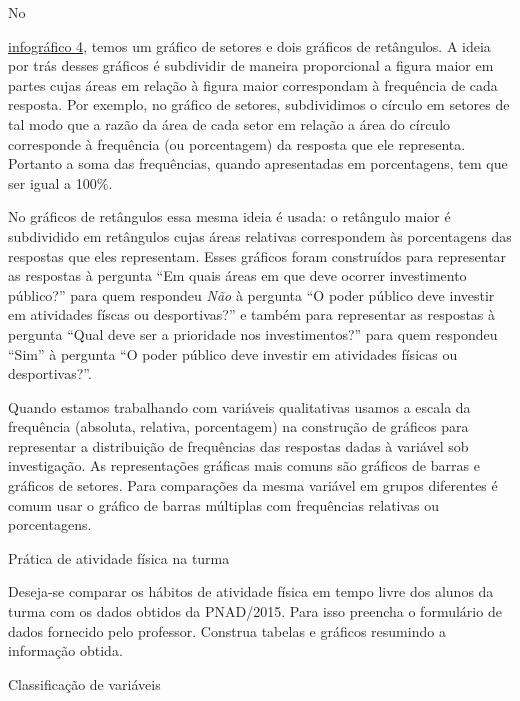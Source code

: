 No {\hyperref[est1-fig-5]{infográfico 4}, temos um gráfico de setores e dois gráficos de retângulos. A ideia por trás desses gráficos é subdividir de maneira proporcional a figura maior em partes cujas áreas em relação à figura maior correspondam à frequência de cada resposta. Por exemplo, no gráfico de setores, subdividimos o círculo em setores de tal modo que a razão da área de cada setor em relação a área do círculo corresponde à frequência (ou porcentagem) da resposta que ele representa. Portanto a soma das frequências, quando apresentadas em porcentagens, tem que ser igual a 100$\%$.

No gráficos de retângulos essa mesma ideia é usada: o retângulo maior é subdividido em retângulos cujas áreas relativas correspondem às porcentagens das respostas que eles representam. Esses gráficos foram construídos para representar as respostas à pergunta ``Em quais áreas em que deve ocorrer investimento público?'' para quem respondeu \emph{Não} à pergunta ``O poder público deve investir em atividades físcas ou desportivas?'' e também para representar as respostas à pergunta ``Qual deve ser a prioridade nos investimentos?'' para quem respondeu ``Sim'' à pergunta ``O poder público deve investir em atividades físicas ou desportivas?''.

\begin{observation}{}

Quando estamos trabalhando com variáveis qualitativas usamos a escala da frequência (absoluta, relativa, porcentagem)  na construção de gráficos para representar a distribuição de frequências das respostas dadas à variável sob investigação. As representações gráficas mais comuns são gráficos de barras e gráficos de setores. Para comparações da mesma variável em grupos diferentes é comum usar o gráfico de barras múltiplas com frequências relativas ou porcentagens.
\end{observation}


\practice{ }
\label{est1-prac-1}

\label{est1-ativ-5}
\begin{task}{ Prática de atividade física na turma}


Deseja-se comparar os hábitos de atividade física em tempo livre dos alunos da turma com os dados obtidos da PNAD/2015. Para isso preencha o formulário de dados fornecido pelo professor. Construa tabelas e gráficos resumindo a informação obtida.
\end{task}
\label{est1-ativ-6}
\begin{task}{ Classificação de variáveis}


\end{task}}
